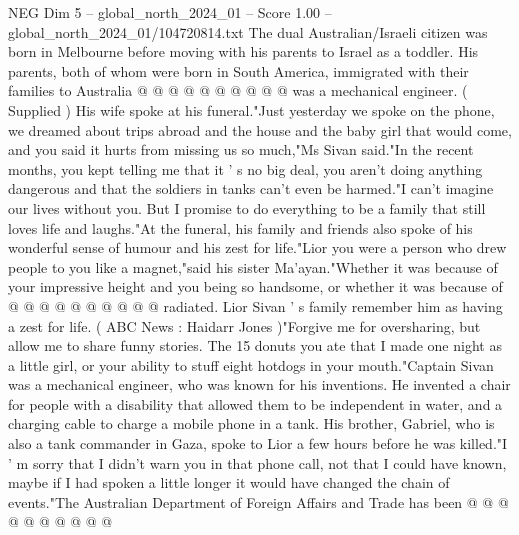 \begin{textsample}{NEG Dim 5 – global\_north\_2024\_01 – Score 1.00 – global\_north\_2024\_01/104720814.txt}
The dual Australian/Israeli citizen was born in Melbourne before moving with his parents to Israel as a toddler.
His parents, both of whom were born in South America, immigrated with their families to Australia @ @ @ @ @ @ @ @ @ @ was a mechanical engineer. ( Supplied ) His wife spoke at his funeral."Just yesterday we spoke on the phone, we dreamed about trips abroad and the house and the baby girl that would come, and you said it hurts from missing us so much,"Ms Sivan said."In the recent months, you kept telling me that it ' s no big deal, you aren't doing anything dangerous and that the soldiers in tanks can't even be harmed."I can't imagine our lives without you.
But I promise to do everything to be a family that still loves life and laughs."At the funeral, his family and friends also spoke of his wonderful sense of humour and his zest for life."Lior you were a person who drew people to you like a magnet,"said his sister Ma'ayan."Whether it was because of your impressive height and you being so handsome, or whether it was because of @ @ @ @ @ @ @ @ @ @ radiated.
Lior Sivan ' s family remember him as having a zest for life. ( ABC News : Haidarr Jones )"Forgive me for oversharing, but allow me to share funny stories.
The 15 donuts you ate that I made one night as a little girl, or your ability to stuff eight hotdogs in your mouth."Captain Sivan was a mechanical engineer, who was known for his inventions.
He invented a chair for people with a disability that allowed them to be independent in water, and a charging cable to charge a mobile phone in a tank.
His brother, Gabriel, who is also a tank commander in Gaza, spoke to Lior a few hours before he was killed."I ' m sorry that I didn't warn you in that phone call, not that I could have known, maybe if I had spoken a little longer it would have changed the chain of events."The Australian Department of Foreign Affairs and Trade has been @ @ @ @ @ @ @ @ @ @

\end{textsample}
